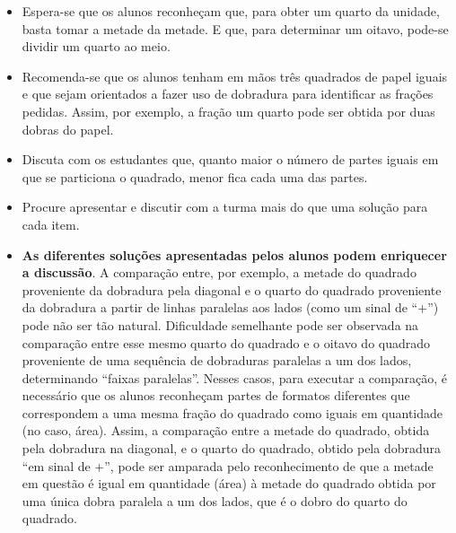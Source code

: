 \begin{multicols}{2}
\begin{orientacoes}
\begin{itemize}
    \item       Espera-se que os alunos reconheçam que, para obter um quarto da unidade, basta tomar a metade da metade. E que, para determinar um oitavo, pode-se dividir um quarto ao meio.
    \item       Recomenda-se que os alunos tenham em mãos três quadrados de papel iguais e que sejam orientados a fazer uso de dobradura para identificar as frações pedidas. Assim, por exemplo, a fração um quarto pode ser obtida por duas dobras do papel.
    \item Discuta com os estudantes que, quanto maior o número de partes iguais em que se particiona o quadrado, menor fica cada uma das partes.
    \item Procure apresentar e discutir com a turma mais do que uma solução para cada item.
    \item \textbf{As diferentes soluções apresentadas pelos alunos podem enriquecer a discussão}. A comparação entre, por exemplo, a metade do quadrado proveniente da dobradura pela diagonal e o quarto do quadrado proveniente da dobradura a partir de linhas paralelas aos lados (como um sinal de ``$+$'') pode não ser tão natural. Dificuldade semelhante pode ser observada na comparação entre esse mesmo quarto do quadrado e o oitavo do quadrado proveniente de uma sequência de dobraduras paralelas a um dos lados, determinando ``faixas paralelas''. Nesses casos, para executar a comparação, é necessário que os alunos reconheçam partes de formatos diferentes que correspondem a uma mesma fração do quadrado como iguais em quantidade (no caso, área). Assim, a comparação entre a metade do quadrado, obtida pela dobradura na diagonal, e o quarto do quadrado, obtido pela dobradura ``em sinal de $+$'', pode ser amparada pelo reconhecimento de que a metade em questão é igual em quantidade (área) à metade do quadrado obtida por uma única dobra paralela a um dos lados, que é o dobro do quarto do quadrado.

\begin{center}
  \quad\quad
\end{center}


\end{itemize}
\end{orientacoes}
\end{multicols}
